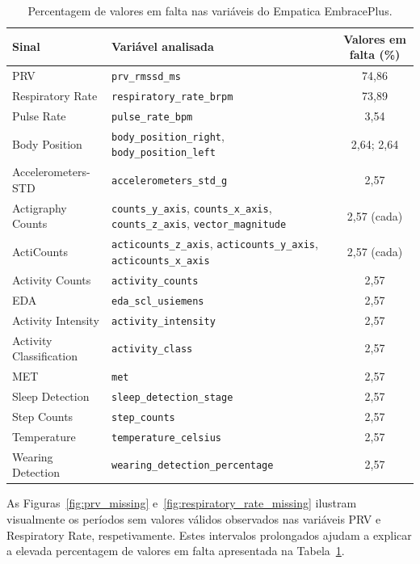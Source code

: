 \begin{table}[H]
\centering
\caption{Percentagem de valores em falta nas variáveis do Empatica EmbracePlus.}
\label{tab:missing_empatica}
\scriptsize
\setlength{\tabcolsep}{3pt}
\begin{tabular}{p{} p{} c}
\toprule
\textbf{Sinal} & \textbf{Variável analisada} & \textbf{Valores em falta (\%)} \\
\midrule
PRV & \texttt{prv\_rmssd\_ms} & 74,86 \\
Respiratory Rate & \texttt{respiratory\_rate\_brpm} & 73,89 \\
Pulse Rate & \texttt{pulse\_rate\_bpm} & 3,54 \\
Body Position & \texttt{body\_position\_right}, \texttt{body\_position\_left} & 2,64; 2,64 \\
Accelerometers-STD & \texttt{accelerometers\_std\_g} & 2,57 \\
Actigraphy Counts & \texttt{counts\_y\_axis}, \texttt{counts\_x\_axis}, \texttt{counts\_z\_axis}, \texttt{vector\_magnitude} & 2,57 (cada) \\
ActiCounts & \texttt{acticounts\_z\_axis}, \texttt{acticounts\_y\_axis}, \texttt{acticounts\_x\_axis} & 2,57 (cada) \\
Activity Counts & \texttt{activity\_counts} & 2,57 \\
EDA & \texttt{eda\_scl\_usiemens} & 2,57 \\
Activity Intensity & \texttt{activity\_intensity} & 2,57 \\
Activity Classification & \texttt{activity\_class} & 2,57 \\
MET & \texttt{met} & 2,57 \\
Sleep Detection & \texttt{sleep\_detection\_stage} & 2,57 \\
Step Counts & \texttt{step\_counts} & 2,57 \\
Temperature & \texttt{temperature\_celsius} & 2,57 \\
Wearing Detection & \texttt{wearing\_detection\_percentage} & 2,57 \\
\bottomrule
\end{tabular}
\end{table}

As Figuras~\ref{fig:prv_missing} e~\ref{fig:respiratory_rate_missing} ilustram visualmente os períodos sem valores válidos observados nas variáveis PRV e Respiratory Rate, respetivamente. Estes intervalos prolongados ajudam a explicar a elevada percentagem de valores em falta apresentada na Tabela~\ref{tab:missing_empatica}.

